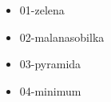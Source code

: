 



\begin{itemize}
\item 01-zelena
\item 02-malanasobilka
\item 03-pyramida
\item 04-minimum
\end{itemize}

